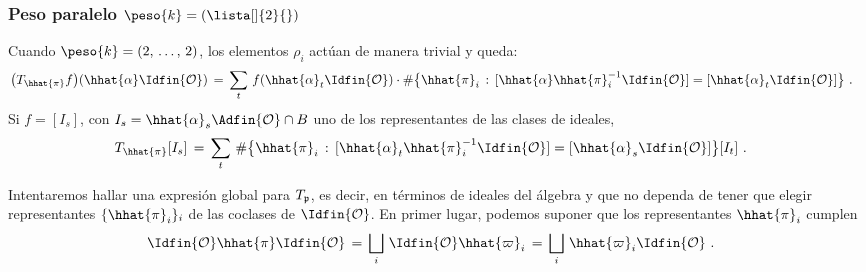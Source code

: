 \subsubsection*{Peso paralelo $\peso{k}=(\lista[\null]{2}{\null})$}
Cuando $\peso{k}=(2,\,\dots,\,2)$, los elementos $\rho_{i}$ act\'{u}an de
manera trivial y queda:
\begin{align*}
	\big(T_{\hhat{\pi}}f\big)
	(\hhat{\alpha}\Idfin{\cal{O}}) & \,=\, \sum_{t}\,
		f(\hhat{\alpha}_{t}\Idfin{\cal{O}})\cdot
		\#\big\{\hhat{\pi}_{i}\,:\,
			[\hhat{\alpha}\hhat{\pi}_{i}^{-1}\Idfin{\cal{O}}]=
			[\hhat{\alpha}_{t}\Idfin{\cal{O}}]
		\big\}
	\text{ .}
\end{align*}
%
Si $f=[I_{s}]$, con $I_{s}=\hhat{\alpha}_{s}\Adfin{\cal{O}}\cap B$ uno de los
representantes de las clases de ideales,
\begin{align*}
	T_{\hhat{\pi}}[I_{s}]
	& \,=\,\sum_{t}\,\#\big\{\hhat{\pi}_{i}\,:\,
		[\hhat{\alpha}_{t}\hhat{\pi}_{i}^{-1}\Idfin{\cal{O}}]=
		[\hhat{\alpha}_{s}\Idfin{\cal{O}}]\big\} [I_{t}]
	\text{ .}
\end{align*}
%

Intentaremos hallar una expresi\'{o}n global para $T_{\frak{p}}$, es decir, en
t\'{e}rminos de ideales del \'{a}lgebra y que no dependa de tener que elegir
representantes $\{\hhat{\pi}_{i}\}_{i}$ de las coclases de $\Idfin{\cal{O}}$.
En primer lugar, podemos suponer que los representantes $\hhat{\pi}_{i}$
cumplen
\begin{align*}
	\Idfin{\cal{O}}\hhat{\pi}\Idfin{\cal{O}} & \,=\,
		\bigsqcup_{i}\,\Idfin{\cal{O}}\hhat{\varpi}_{i}
		\,=\,\bigsqcup_{i}\,\hhat{\varpi}_{i}\Idfin{\cal{O}}
	\text{ .}
\end{align*}
%

